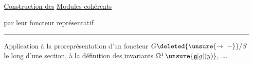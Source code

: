\uline{Construction des} \uline{Modules cohérents}

 par leur foncteur représentatif

\noindent\hfill\rule{1.3cm}{0.5pt}\hfill\mbox{}

Application à la proreprésentation d'un foncteur $G\deleted{\unsure{\to|-}}/S$ le long d'une section, à la définition des invariants $\Omega^{1}\,\unsure{\mathfrak{g}|g|(y)}$, \ldots.


